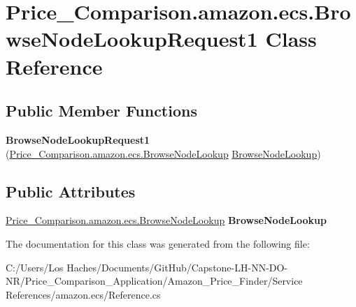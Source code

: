 \hypertarget{class_price___comparison_1_1amazon_1_1ecs_1_1_browse_node_lookup_request1}{\section{Price\-\_\-\-Comparison.\-amazon.\-ecs.\-Browse\-Node\-Lookup\-Request1 Class Reference}
\label{class_price___comparison_1_1amazon_1_1ecs_1_1_browse_node_lookup_request1}
}
\subsection*{Public Member Functions}
\begin{DoxyCompactItemize}
\item 
\hypertarget{class_price___comparison_1_1amazon_1_1ecs_1_1_browse_node_lookup_request1_ae35cd603dddd15fc18d15bf5f46ccd8e}{{\bfseries Browse\-Node\-Lookup\-Request1} (\hyperlink{class_price___comparison_1_1amazon_1_1ecs_1_1_browse_node_lookup}{Price\-\_\-\-Comparison.\-amazon.\-ecs.\-Browse\-Node\-Lookup} \hyperlink{class_price___comparison_1_1amazon_1_1ecs_1_1_browse_node_lookup}{Browse\-Node\-Lookup})}\label{class_price___comparison_1_1amazon_1_1ecs_1_1_browse_node_lookup_request1_ae35cd603dddd15fc18d15bf5f46ccd8e}

\end{DoxyCompactItemize}
\subsection*{Public Attributes}
\begin{DoxyCompactItemize}
\item 
\hypertarget{class_price___comparison_1_1amazon_1_1ecs_1_1_browse_node_lookup_request1_a6dec72ed635bd9993c1334183198f968}{\hyperlink{class_price___comparison_1_1amazon_1_1ecs_1_1_browse_node_lookup}{Price\-\_\-\-Comparison.\-amazon.\-ecs.\-Browse\-Node\-Lookup} {\bfseries Browse\-Node\-Lookup}}\label{class_price___comparison_1_1amazon_1_1ecs_1_1_browse_node_lookup_request1_a6dec72ed635bd9993c1334183198f968}

\end{DoxyCompactItemize}


The documentation for this class was generated from the following file\-:\begin{DoxyCompactItemize}
\item 
C\-:/\-Users/\-Los Haches/\-Documents/\-Git\-Hub/\-Capstone-\/\-L\-H-\/\-N\-N-\/\-D\-O-\/\-N\-R/\-Price\-\_\-\-Comparison\-\_\-\-Application/\-Amazon\-\_\-\-Price\-\_\-\-Finder/\-Service References/amazon.\-ecs/Reference.\-cs\end{DoxyCompactItemize}
